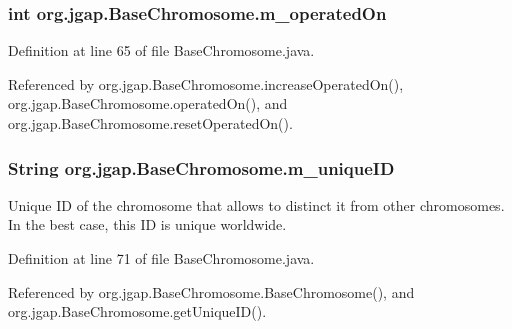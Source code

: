 \hypertarget{classorg_1_1jgap_1_1_base_chromosome_af0a5c64437918ed0e28233f39fa60a30}{
\subsubsection[{m\-\_\-operated\-On}]{\setlength{\rightskip}{0pt plus 5cm}int org.\-jgap.\-Base\-Chromosome.\-m\-\_\-operated\-On\hspace{0.3cm}{\ttfamily [private]}}}\label{classorg_1_1jgap_1_1_base_chromosome_af0a5c64437918ed0e28233f39fa60a30}


Definition at line 65 of file Base\-Chromosome.\-java.



Referenced by org.\-jgap.\-Base\-Chromosome.\-increase\-Operated\-On(), org.\-jgap.\-Base\-Chromosome.\-operated\-On(), and org.\-jgap.\-Base\-Chromosome.\-reset\-Operated\-On().

\hypertarget{classorg_1_1jgap_1_1_base_chromosome_a04dcfa7a4ba552f754ab440b21ebe558}{
\subsubsection[{m\-\_\-unique\-I\-D}]{\setlength{\rightskip}{0pt plus 5cm}String org.\-jgap.\-Base\-Chromosome.\-m\-\_\-unique\-I\-D\hspace{0.3cm}{\ttfamily [private]}}}\label{classorg_1_1jgap_1_1_base_chromosome_a04dcfa7a4ba552f754ab440b21ebe558}
Unique I\-D of the chromosome that allows to distinct it from other chromosomes. In the best case, this I\-D is unique worldwide. 

Definition at line 71 of file Base\-Chromosome.\-java.



Referenced by org.\-jgap.\-Base\-Chromosome.\-Base\-Chromosome(), and org.\-jgap.\-Base\-Chromosome.\-get\-Unique\-I\-D().

